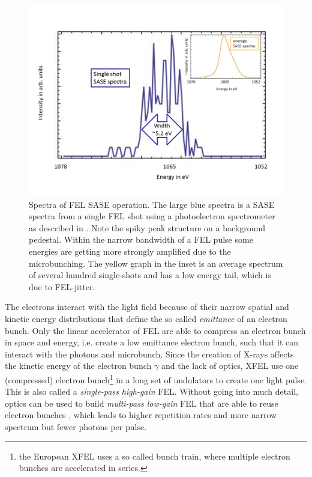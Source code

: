 \begin{figure}
	\centering
		\includegraphics[width=1.00\textwidth]{images/SASE-spectra.png}
	\caption[SASE single-shot and average spectra]{Spectra of FEL SASE operation. The large blue spectra is a SASE spectra from a single FEL shot using a photoelectron spectrometer as described in \citep{Bucher-2014-Unpublished}. Note the spiky peak structure on a background pedestal. Within the narrow bandwidth of a FEL pulse some energies are getting more strongly amplified due to the microbunching. The yellow graph in the inset is an average spectrum of several hundred single-shots and has a low energy tail, which is due to FEL-jitter.}
	\label{fig:SASE-spectra}
\end{figure}
The electrons interact with the light field because of their narrow spatial and kinetic energy distributions that define the so called \textit{emittance} of an electron bunch. Only the linear accelerator of FEL are able to compress an electron bunch in space and energy, i.e. create a low emittance electron bunch, such that it can interact with the photons and microbunch. Since the creation of X-rays affects the kinetic energy of the electron bunch $\gamma$ and the lack of optics, XFEL use one (compressed) electron bunch\footnote{the European XFEL uses a so called bunch train, where multiple electron bunches are accelerated in series.} in a long set of undulators to create one light pulse. This is also called a \textit{single-pass high-gain} FEL. Without going into much detail, optics can be used to build \textit{multi-pass low-gain} FEL that are able to reuse electron bunches \citep{Kim-2008-PRL}, which leads to higher repetition rates and more narrow spectrum but fewer photons per pulse.
%
%
%
%

